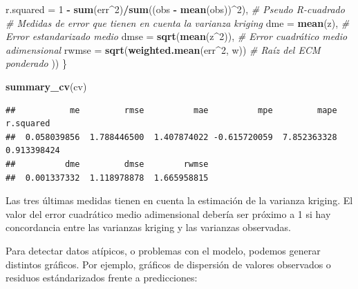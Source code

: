 \documentclass[
]{book}
\newenvironment{Shaded}{\begin{snugshade}}{\end{snugshade}}
\newcommand{\AttributeTok}[1]{\textcolor[rgb]{0.13,0.29,0.53}{#1}}
\newcommand{\CommentTok}[1]{\textcolor[rgb]{0.56,0.35,0.01}{\textit{#1}}}
\newcommand{\DecValTok}[1]{\textcolor[rgb]{0.00,0.00,0.81}{#1}}
\newcommand{\FunctionTok}[1]{\textcolor[rgb]{0.13,0.29,0.53}{\textbf{#1}}}
\newcommand{\NormalTok}[1]{#1}
\newcommand{\SpecialCharTok}[1]{\textcolor[rgb]{0.81,0.36,0.00}{\textbf{#1}}}
\theoremstyle{break}
\theoremstyle{definition}
\theoremstyle{definition}
\theoremstyle{definition}
\theoremstyle{definition}
\theoremstyle{remark}
\begin{document}
\begin{Shaded}
\begin{Highlighting}[]
    \AttributeTok{r.squared =} \DecValTok{1} \SpecialCharTok{{-}} \FunctionTok{sum}\NormalTok{(err}\SpecialCharTok{\^{}}\DecValTok{2}\NormalTok{)}\SpecialCharTok{/}\FunctionTok{sum}\NormalTok{((obs }\SpecialCharTok{{-}} \FunctionTok{mean}\NormalTok{(obs))}\SpecialCharTok{\^{}}\DecValTok{2}\NormalTok{), }\CommentTok{\# Pseudo R{-}cuadrado}
    \CommentTok{\# Medidas de error que tienen en cuenta la varianza kriging}
    \AttributeTok{dme =} \FunctionTok{mean}\NormalTok{(z),            }\CommentTok{\# Error estandarizado medio}
    \AttributeTok{dmse =} \FunctionTok{sqrt}\NormalTok{(}\FunctionTok{mean}\NormalTok{(z}\SpecialCharTok{\^{}}\DecValTok{2}\NormalTok{)),    }\CommentTok{\# Error cuadrático medio adimensional}
    \AttributeTok{rwmse =} \FunctionTok{sqrt}\NormalTok{(}\FunctionTok{weighted.mean}\NormalTok{(err}\SpecialCharTok{\^{}}\DecValTok{2}\NormalTok{, w)) }\CommentTok{\# Raíz del ECM ponderado}
\NormalTok{  ))}
\NormalTok{\}}

\FunctionTok{summary\_cv}\NormalTok{(cv)}
\end{Highlighting}
\end{Shaded}

\begin{verbatim}
##           me         rmse          mae          mpe         mape    r.squared 
##  0.058039856  1.788446500  1.407874022 -0.615720059  7.852363328  0.913398424 
##          dme         dmse        rwmse 
##  0.001337332  1.118978878  1.665958815
\end{verbatim}

Las tres últimas medidas tienen en cuenta la estimación de la varianza kriging.
El valor del error cuadrático medio adimensional debería ser próximo a 1 si hay concordancia entre las varianzas kriging y las varianzas observadas.

Para detectar datos atípicos, o problemas con el modelo, podemos generar distintos gráficos.
Por ejemplo, gráficos de dispersión de valores observados o residuos estándarizados frente a predicciones:
\end{document}
